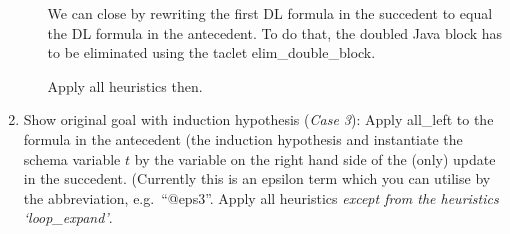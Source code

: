 \documentclass[11pt]{article}
\begin{document}
\begin{enumerate}
\begin{itemize}
			We can close by rewriting the first DL formula in the
			succedent to equal the DL formula in the antecedent. To
			do that, the doubled Java block has to be eliminated
			using the taclet \textsf{elim\_double\_block}.

			Apply all heuristics then.

		\end{itemize} \item Show original goal with induction
		hypothesis (\emph{Case 3}): Apply \textsf{all\_left} to the
		formula in the antecedent (the induction hypothesis and
		instantiate the schema variable $t$ by the variable on the
		right hand side of the (only) update in the
		succedent. (Currently this is an epsilon term which you can
		utilise by the abbreviation, e.g.~``@eps3''. Apply all
		heuristics \emph{except from the heuristics `loop\_expand'}.
\end{enumerate}
\end{document}
